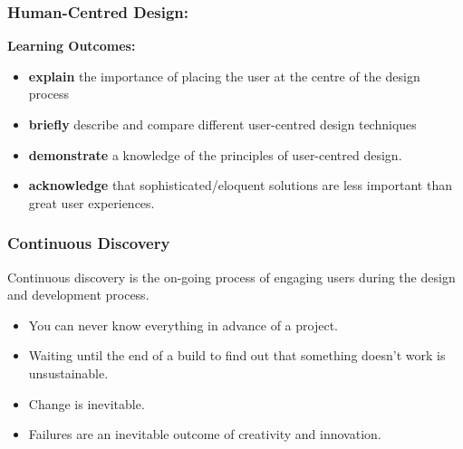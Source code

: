 {
      \begin{frame}[plain]
     \end{frame}
}


\begin{frame}
	\frametitle{Human-Centred Design:}
	
	\textbf{Learning Outcomes:}
	
	\begin{itemize}
		\item \textbf{explain} the importance of placing the user at the centre of the design process
		\item \textbf{briefly} describe and compare different user-centred design techniques
		\item \textbf{demonstrate} a knowledge of the principles of user-centred design.	
		\item \textbf{acknowledge} that sophisticated/eloquent solutions are less important than great user experiences. 
	\end{itemize}
\end{frame}



\begin{frame}
	\frametitle{Continuous Discovery}
	Continuous discovery is the on-going process of engaging users during the design and development process. 
	\begin{itemize}
		\item \pause You can never know everything in advance of a project.
		\item \pause Waiting until the end of a build to find out that something doesn't work is unsustainable. 
		\item \pause Change is inevitable.
		\item \pause Failures are an inevitable outcome of creativity and innovation. 
	\end{itemize}
\end{frame}	

